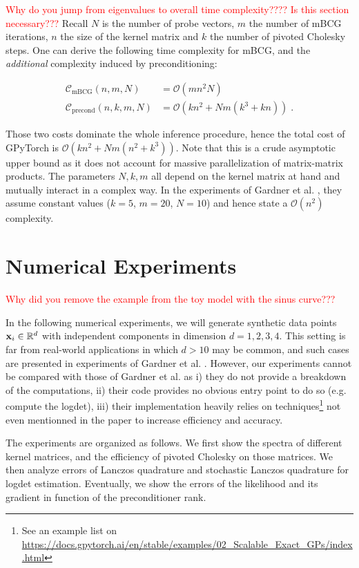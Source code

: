 \documentclass{article}
\begin{document}
{\textcolor{red}{Why do you jump from eigenvalues to overall time complexity???? Is this section necessary??? }Recall $N$ is the number of probe vectors, $m$ the number of mBCG iterations, $n$ the size of the kernel matrix and $k$ the number of pivoted Cholesky steps. One can derive the following time complexity for mBCG, and the \emph{additional} complexity induced by preconditioning:

\begin{align*}
    \mathcal C_{\text{mBCG}}(n, m, N) &= \mathcal O(mn^2N) \\
    \mathcal C_{\text{precond}}(n, k, m, N) &= \mathcal O(k n^2 + Nm(k^3 + kn)) \; .
\end{align*}

Those two costs dominate the whole inference procedure, hence the total cost of GPyTorch is $\mathcal O(kn^2 + Nm(n^2 + k^3))$. Note that this is a crude asymptotic upper bound as it does not account for massive parallelization of matrix-matrix products. The parameters $N, k, m$ all depend on the kernel matrix at hand and mutually interact in a complex way. In the experiments of Gardner et al. \cite{gardner_gpytorch_2021}, they assume constant values ($k=5$, $m=20$, $N=10$) and hence state a $\mathcal O(n^2)$ complexity. 

\section{Numerical Experiments} \label{sec:numexp}

\textcolor{red}{Why did you remove the example from the toy model with the sinus curve???}

In the following numerical experiments, we will generate synthetic data points $\boldsymbol{\mathbf{x}}_i \in \mathbb R^d$ with independent components in dimension $d=1,2,3,4$. This setting is far from real-world applications in which $d>10$ may be common, and such cases are presented in experiments of Gardner et al. \cite{gardner_gpytorch_2021}.
However, our experiments cannot be compared with those of Gardner et al. \cite{gardner_gpytorch_2021} as i) they do not provide a breakdown of the computations, ii) their code provides no obvious entry point to do so (e.g. compute the logdet), iii) their implementation heavily relies on techniques\footnote{See an example list on \url{https://docs.gpytorch.ai/en/stable/examples/02_Scalable_Exact_GPs/index.html}} not even mentionned in the paper to increase efficiency and accuracy. 

The experiments are organized as follows. We first show the spectra of different kernel matrices, and the efficiency of pivoted Cholesky on those matrices. We then analyze errors of Lanczos quadrature and stochastic Lanczos quadrature for logdet estimation. Eventually, we show the errors of the likelihood and its gradient in function of the preconditioner rank. 


}
\end{document}
